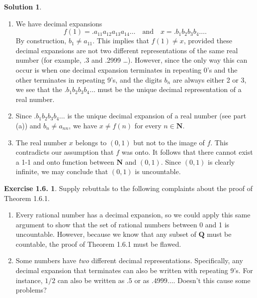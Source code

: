 \documentclass[12pt]{article}
\theoremstyle{definition}
\theoremstyle{exercise}
\newtheorem{exercise}{Exercise 1.6.}
\theoremstyle{solution}
\newtheorem*{solution}{Solution}
\newcommand{\N}{\mathbf{N}}
\newcommand{\Q}{\mathbf{Q}}
\begin{document}
\begin{solution}
    \begin{enumerate}
        \item We have decimal expansions
        \[
            f(1) = .a_{11} a_{12} a_{13} a_{14} \ldots \quad \text{and} \quad x = .b_1 b_2 b_3 b_4 \ldots.
        \]
        By construction, \( b_1 \neq a_{11} \). This implies that \( f(1) \neq x \), provided these decimal expansions are not two different representations of the same real number (for example, .3 and .2999 \ldots). However, since the only way this can occur is when one decimal expansion terminates in repeating 0's and the other terminates in repeating 9's, and the digits \( b_n \) are always either 2 or 3, we see that the \( .b_1 b_2 b_3 b_4 \ldots \) must be the unique decimal representation of a real number.

        \item Since \( .b_1 b_2 b_3 b_4 \ldots \) is the unique decimal expansion of a real number (see part (a)) and \( b_n \neq a_{nn} \), we have \( x \neq f(n) \) for every \( n \in \N \).

        \item The real number \( x \) belongs to \( (0, 1) \) but not to the image of \( f \). This contradicts our assumption that \( f \) was onto. It follows that there cannot exist a 1-1 and onto function between \( \N \) and \( (0, 1) \). Since \( (0, 1) \) is clearly infinite, we may conclude that \( (0,1 ) \) is uncountable.
    \end{enumerate}
\end{solution}

\begin{exercise}
\label{ex:3}
    Supply rebuttals to the following complaints about the proof of Theorem 1.6.1.
    \begin{enumerate}
        \item Every rational number has a decimal expansion, so we could apply this same argument to show that the set of rational numbers between 0 and 1 is uncountable. However, because we know that any subset of \( \Q \) must be countable, the proof of Theorem 1.6.1 must be flawed.

        \item Some numbers have \textit{two} different decimal representations. Specifically, any decimal expansion that terminates can also be written with repeating 9's. For instance, \( 1/2 \) can also be written as \( .5 \) or as \( .4999 \ldots \). Doesn't this cause some problems?
    \end{enumerate}
\end{exercise}
\end{document}
